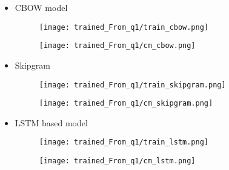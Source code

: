 \documentclass{article}
\begin{document}
\begin{itemize}[noitemsep]
    \item CBOW model
    \vspace{-1.0em}
    \begin{figure}[H]
    \centering
    \begin{minipage}{.5\linewidth}
        \centering
        \texttt{[image: trained\_From\_q1/train\_cbow.png]}
        \vspace{-1.0em}

    \end{minipage}%
    \begin{minipage}{.5\textwidth}
      \centering
      \texttt{[image: trained\_From\_q1/cm\_cbow.png]}
      \vspace{-1.0em}

    \end{minipage}
    \end{figure}
    
    \vspace{-1.0em}
    \item Skipgram
    \vspace{-1.0em}
    \begin{figure}[H]
    \centering
    \begin{minipage}{.5\linewidth}
        \centering
        \texttt{[image: trained\_From\_q1/train\_skipgram.png]}
        \vspace{-1.0em}

    \end{minipage}%
    \begin{minipage}{.5\textwidth}
      \centering
      \texttt{[image: trained\_From\_q1/cm\_skipgram.png]}
      \vspace{-1.0em}

    \end{minipage}
    \end{figure}
    
    \vspace{-1.0em}
    \item LSTM based model
    \vspace{-1.0em}   
    \begin{figure}[H]
    \centering
    \begin{minipage}{.5\linewidth}
        \centering
        \texttt{[image: trained\_From\_q1/train\_lstm.png]}
        \vspace{-1.0em}

    \end{minipage}%
    \begin{minipage}{.5\textwidth}
      \centering
      \texttt{[image: trained\_From\_q1/cm\_lstm.png]}
      \vspace{-1.0em}

    \end{minipage}
    \end{figure}
    
\end{itemize}
\end{document}
